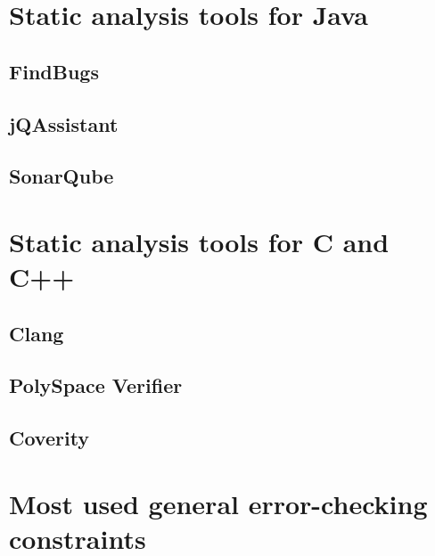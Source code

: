 \section{Static analysis tools for Java}


\subsection{FindBugs}


\subsection{jQAssistant}


\subsection{SonarQube}


\section{Static analysis tools for C and C++}


\subsection{Clang}


\subsection{PolySpace Verifier}


\subsection{Coverity}


\section{Most used general error-checking constraints}